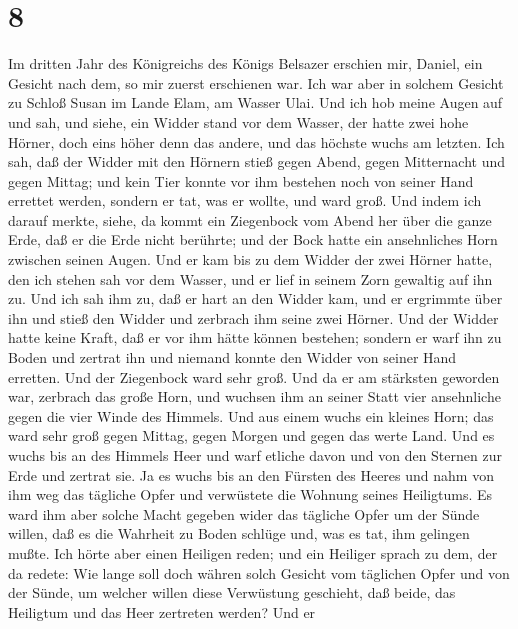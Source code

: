 \hypertarget{section-7}{%
\section{8}\label{section-7}}

 Im dritten Jahr des Königreichs des Königs Belsazer
erschien mir, Daniel, ein Gesicht nach dem, so mir zuerst erschienen
war.  Ich war aber in solchem Gesicht zu Schloß Susan im
Lande Elam, am Wasser Ulai.  Und ich hob meine Augen auf und
sah, und siehe, ein Widder stand vor dem Wasser, der hatte zwei hohe
Hörner, doch eins höher denn das andere, und das höchste wuchs am
letzten.  Ich sah, daß der Widder mit den Hörnern stieß
gegen Abend, gegen Mitternacht und gegen Mittag; und kein Tier konnte
vor ihm bestehen noch von seiner Hand errettet werden, sondern er tat,
was er wollte, und ward groß.  Und indem ich darauf merkte,
siehe, da kommt ein Ziegenbock vom Abend her über die ganze Erde, daß er
die Erde nicht berührte; und der Bock hatte ein ansehnliches Horn
zwischen seinen Augen.  Und er kam bis zu dem Widder der
zwei Hörner hatte, den ich stehen sah vor dem Wasser, und er lief in
seinem Zorn gewaltig auf ihn zu.  Und ich sah ihm zu, daß er
hart an den Widder kam, und er ergrimmte über ihn und stieß den Widder
und zerbrach ihm seine zwei Hörner. Und der Widder hatte keine Kraft,
daß er vor ihm hätte können bestehen; sondern er warf ihn zu Boden und
zertrat ihn und niemand konnte den Widder von seiner Hand erretten.
 Und der Ziegenbock ward sehr groß. Und da er am stärksten
geworden war, zerbrach das große Horn, und wuchsen ihm an seiner Statt
vier ansehnliche gegen die vier Winde des Himmels.  Und aus
einem wuchs ein kleines Horn; das ward sehr groß gegen Mittag, gegen
Morgen und gegen das werte Land.  Und es wuchs bis an des
Himmels Heer und warf etliche davon und von den Sternen zur Erde und
zertrat sie.  Ja es wuchs bis an den Fürsten des Heeres und
nahm von ihm weg das tägliche Opfer und verwüstete die Wohnung seines
Heiligtums.  Es ward ihm aber solche Macht gegeben wider
das tägliche Opfer um der Sünde willen, daß es die Wahrheit zu Boden
schlüge und, was es tat, ihm gelingen mußte.  Ich hörte
aber einen Heiligen reden; und ein Heiliger sprach zu dem, der da
redete: Wie lange soll doch währen solch Gesicht vom täglichen Opfer und
von der Sünde, um welcher willen diese Verwüstung geschieht, daß beide,
das Heiligtum und das Heer zertreten werden?  Und er
